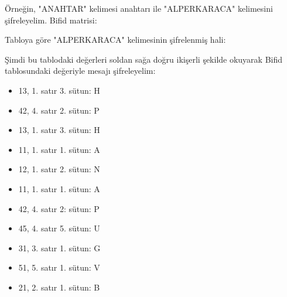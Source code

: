 Örneğin, "ANAHTAR" kelimesi anahtarı ile "ALPERKARACA" kelimesini şifreleyelim. Bifid matrisi:

\begin{table}[ht]
\centering
{}
\end{table}

\newpage

Tabloya göre "ALPERKARACA" kelimesinin şifrelenmiş hali:

\begin{table}[ht]
\centering
{}
\end{table}

Şimdi bu tablodaki değerleri soldan sağa doğru ikişerli şekilde okuyarak Bifid tablosundaki değeriyle mesajı şifreleyelim:

\begin{itemize}
    \item 13, 1. satır 3. sütun: H
    \item 42, 4. satır 2. sütun: P
    \item 13, 1. satır 3. sütun: H
    \item 11, 1. satır 1. sütun: A
    \item 12, 1. satır 2. sütun: N
    \item 11, 1. satır 1. sütun: A
    \item 42, 4. satır 2: sütun: P
    \item 45, 4. satır 5. sütun: U
    \item 31, 3. satır 1. sütun: G
    \item 51, 5. satır 1. sütun: V
    \item 21, 2. satır 1. sütun: B
\end{itemize}

